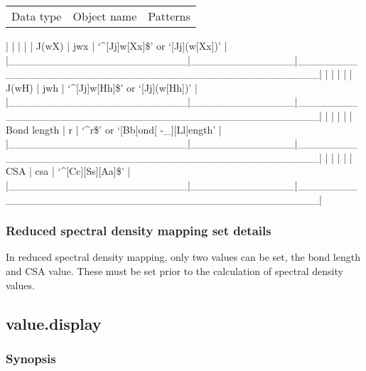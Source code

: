\begin{tabular}{ccc}
Data type & Object name & Patterns \\
\end{tabular}
|                        |              |                                                  |
| J(wX)                  | jwx          | `\^{}[Jj]w[Xx]\$' or `[Jj](w[Xx])'                   |
|\_\_\_\_\_\_\_\_\_\_\_\_\_\_\_\_\_\_\_\_\_\_\_\_|\_\_\_\_\_\_\_\_\_\_\_\_\_\_|\_\_\_\_\_\_\_\_\_\_\_\_\_\_\_\_\_\_\_\_\_\_\_\_\_\_\_\_\_\_\_\_\_\_\_\_\_\_\_\_\_\_\_\_\_\_\_\_\_\_|
|                        |              |                                                  |
| J(wH)                  | jwh          | `\^{}[Jj]w[Hh]\$' or `[Jj](w[Hh])'                   |
|\_\_\_\_\_\_\_\_\_\_\_\_\_\_\_\_\_\_\_\_\_\_\_\_|\_\_\_\_\_\_\_\_\_\_\_\_\_\_|\_\_\_\_\_\_\_\_\_\_\_\_\_\_\_\_\_\_\_\_\_\_\_\_\_\_\_\_\_\_\_\_\_\_\_\_\_\_\_\_\_\_\_\_\_\_\_\_\_\_|
|                        |              |                                                  |
| Bond length            | r            | `\^{}r\$' or `[Bb]ond[ -\_][Ll]ength'                 |
|\_\_\_\_\_\_\_\_\_\_\_\_\_\_\_\_\_\_\_\_\_\_\_\_|\_\_\_\_\_\_\_\_\_\_\_\_\_\_|\_\_\_\_\_\_\_\_\_\_\_\_\_\_\_\_\_\_\_\_\_\_\_\_\_\_\_\_\_\_\_\_\_\_\_\_\_\_\_\_\_\_\_\_\_\_\_\_\_\_|
|                        |              |                                                  |
| CSA                    | csa          | `\^{}[Cc][Ss][Aa]\$'                                 |
|\_\_\_\_\_\_\_\_\_\_\_\_\_\_\_\_\_\_\_\_\_\_\_\_|\_\_\_\_\_\_\_\_\_\_\_\_\_\_|\_\_\_\_\_\_\_\_\_\_\_\_\_\_\_\_\_\_\_\_\_\_\_\_\_\_\_\_\_\_\_\_\_\_\_\_\_\_\_\_\_\_\_\_\_\_\_\_\_\_|



\subsubsection{Reduced spectral density mapping set details}

In reduced spectral density mapping, only two values can be set, the bond length and CSA
value.  These must be set prior to the calculation of spectral density values.


\newpage

\subsection{value.display}


\subsubsection{Synopsis}

